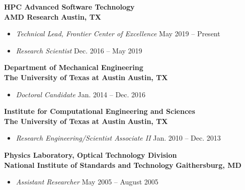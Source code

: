 
\textbf{HPC Advanced Software Technology}\\
\textbf{AMD Research} \hfill \textbf{Austin, TX}
%
\begin{itemize}
\item[] \textit{Technical Lead, Frontier Center of Excellence} \hfill
	May 2019 -- Present
\item[] \textit{Research Scientist} \hfill
	Dec. 2016 -- May 2019

\end{itemize}

\blankline


\textbf{Department of Mechanical Engineering}\\
\textbf{The University of Texas at Austin} \hfill \textbf{Austin, TX}
%
\begin{itemize}
\item[] \textit{Doctoral Candidate} \hfill
	Jan. 2014 -- Dec. 2016
\end{itemize}

\blankline

\textbf{Institute for Computational Engineering and Sciences}\\
\textbf{The University of Texas at Austin} \hfill \textbf{Austin, TX}
%
\begin{itemize}
\item[] \textit{Research Engineering/Scientist Associate II} \hfill
	Jan. 2010 -- Dec. 2013
\end{itemize}

\blankline

\textbf{Physics Laboratory, Optical Technology Division}\\
\textbf{National Institute of Standards and Technology} \hfill \textbf{Gaithersburg, MD}
%
\begin{itemize}
\item[] \textit{Assistant Researcher} \hfill
	May 2005 -- August 2005
\end{itemize}